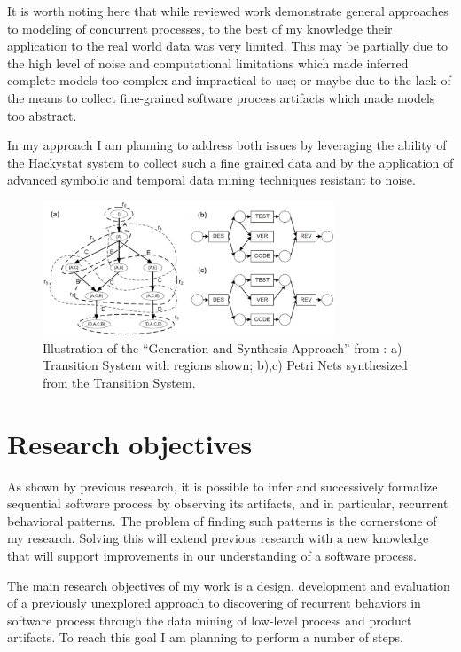 \documentclass{sig-alternate}
\begin{document}
It is worth noting here that while reviewed work demonstrate general approaches to modeling of concurrent processes, to the best of my knowledge their application to the real world data was very limited. This may be partially due to the high level of noise and computational limitations which made inferred complete models too complex and impractical to use; or maybe due to the lack of the means to collect fine-grained software process artifacts which made models too abstract.

In my approach I am planning to address both issues by leveraging the ability of the Hackystat system \cite{citeulike:4041809} to collect such a fine grained data and by the application of advanced symbolic and temporal data mining techniques resistant to noise.

\begin{figure}[htpb]
   \centering
   \includegraphics[height=40mm]{petri.eps}
   \caption{Illustration of the ``Generation and Synthesis Approach'' from \cite{citeulike:5043673}: a) Transition System with regions shown; b),c) Petri Nets synthesized from the Transition System.}
   \label{fig:petri}
\end{figure}

\section{Research objectives}
As shown by previous research, it is possible to infer and successively formalize sequential software process by observing its artifacts, and in particular, recurrent behavioral patterns. The problem of finding such patterns is the cornerstone of my research. Solving this will extend previous research with a new knowledge that will support improvements in our understanding of a software process.

The main research objectives of my work is a design, development and evaluation of a previously unexplored approach to discovering of recurrent behaviors in software process through the data mining of low-level process and product artifacts. To reach this goal I am planning to perform a number of steps. 
\end{document}
